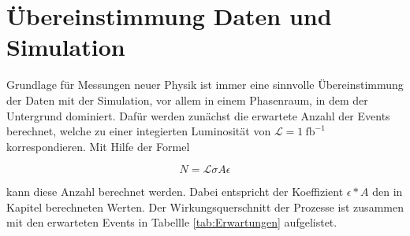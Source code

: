 \section{Übereinstimmung Daten und Simulation}
\label{sec:aufgabe6}

Grundlage für Messungen neuer Physik ist immer eine sinnvolle Übereinstimmung 
der Daten mit der Simulation, vor allem in einem Phasenraum, in dem der 
Untergrund dominiert. Dafür werden zunächst die erwartete Anzahl der Events 
berechnet, welche zu einer integierten Luminosität von 
$\mathcal{L} = \SI{1}{\femto\barn}^{-1}$ korrespondieren. Mit Hilfe der Formel 

\begin{equation}
N = \mathcal{L} \sigma A \epsilon
\end{equation}

kann diese Anzahl berechnet werden. Dabei entspricht der Koeffizient 
$\epsilon * A$ den in Kapitel \label{sec:aufgabe3}
berechneten Werten. Der Wirkungsquerschnitt der Prozesse ist zusammen mit 
den erwarteten Events in Tabellle \ref{tab:Erwartungen} aufgelistet.